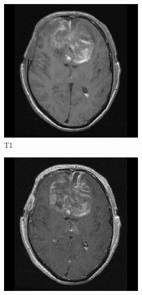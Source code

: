 \begin{figure}[htbp]
\centering
\begin{subfigure}[b]{\textwidth}
    \centering
    \hfill
    \begin{subfigure}[b]{0.24\textwidth}
    \includegraphics[width=\textwidth, clip, trim=2.5cm 0.5cm 2.5cm 0.5cm]{Figures/TCGA-DU-6410_T1.png}
    \caption*{\acrshort{T1}\nopunct}
    \end{subfigure}
    \hfill
    \begin{subfigure}[b]{0.24\textwidth}
    \includegraphics[width=\textwidth, clip, trim=2.5cm 0.5cm 2.5cm 0.5cm]{Figures/TCGA-DU-6410_T1GD.png}

\end{subfigure}
\end{subfigure}
\end{figure}
